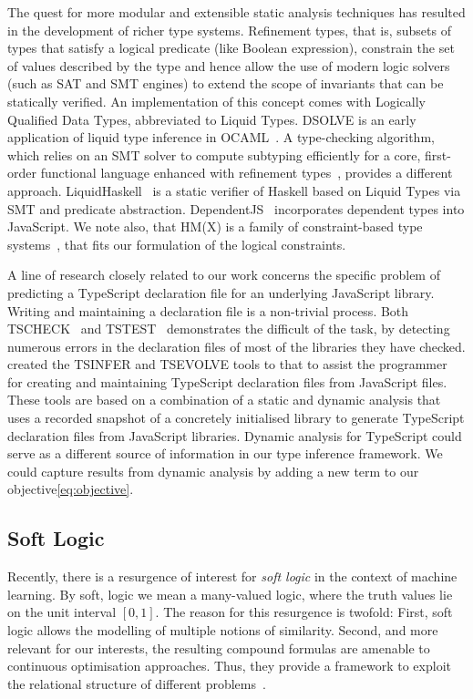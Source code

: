 \documentclass[acmsmall,nonacm]{acmart}\settopmatter{printfolios=true,printccs=false,printacmref=false}
\begin{document}
The quest for more modular and extensible static analysis techniques has
resulted in the development of richer type systems.
Refinement types, that is, subsets of types that satisfy a logical predicate (like Boolean expression),
constrain the set of values described by the type and hence allow the use of
modern logic solvers (such as SAT and SMT engines) to extend the
scope of invariants that can be statically verified.
An implementation of this concept comes with Logically Qualified Data Types,
abbreviated to Liquid Types.
DSOLVE is an early application of liquid type inference in OCAML~\citep{liquid}.
A type-checking algorithm, which relies on an SMT solver
to compute subtyping efficiently for a core, first-order functional language
enhanced with refinement types~\citep{semanticSMT}, provides a different
approach.
LiquidHaskell~\citep{refHaskell} is a static verifier of
Haskell based on Liquid Types via SMT and predicate
abstraction.
DependentJS~\citep{dependentJS} incorporates dependent types into JavaScript. We note also, that HM(X) is a family of constraint-based type
systems~\citep{odersky99,pottier05}, that fits our formulation of the logical constraints.

A line of research closely related to our work concerns
the specific problem of predicting a TypeScript declaration file for an underlying JavaScript library. Writing and maintaining a declaration file is a non-trivial process. Both TSCHECK~\cite{feldthaus14} and TSTEST~\cite{kristensen17} demonstrates the difficult of the task, by detecting numerous errors in the declaration files of most of the libraries they have checked. \cite{tstools17} created the TSINFER and TSEVOLVE tools to that to assist the 
programmer for creating and maintaining TypeScript declaration files from JavaScript files. These tools are based on a combination of a static and dynamic analysis that uses a recorded snapshot of a concretely initialised library to generate TypeScript declaration files from JavaScript libraries. Dynamic analysis for TypeScript could serve as a different
source of information in our type inference framework. We
could capture results from dynamic analysis by adding a new term to our objective\eqref{eq:objective}.

 
\subsection{Soft Logic}\label{ssec:softlogic}

Recently, there is a resurgence of interest for \textit{soft logic} in the context of machine learning. By soft, logic we mean a many-valued logic, where the truth values lie on the unit interval $[0,1]$. The 
reason for this resurgence is twofold: First,
soft logic allows the modelling of multiple notions
of similarity. Second, and more relevant for our
interests, the resulting compound formulas are 
amenable to continuous optimisation approaches. Thus, they provide a framework to exploit the relational structure of different problems~\cite{kimmig12}.
\end{document}
